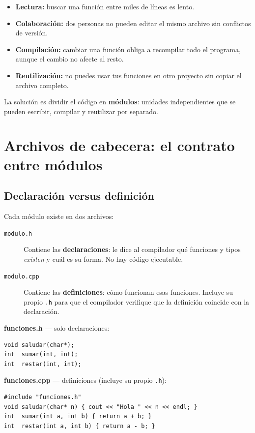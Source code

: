 \documentclass[12pt, oneside]{article}
\begin{document}
\begin{itemize}
  \item \textbf{Lectura:} buscar una función entre miles de líneas es lento.
  \item \textbf{Colaboración:} dos personas no pueden editar el mismo archivo
        sin conflictos de versión.
  \item \textbf{Compilación:} cambiar una función obliga a recompilar todo el
        programa, aunque el cambio no afecte al resto.
  \item \textbf{Reutilización:} no puedes usar tus funciones en otro proyecto
        sin copiar el archivo completo.
\end{itemize}

La solución es dividir el código en \textbf{módulos}: unidades independientes
que se pueden escribir, compilar y reutilizar por separado.

\section{Archivos de cabecera: el contrato entre módulos}

\subsection{Declaración versus definición}

Cada módulo existe en dos archivos:

\begin{description}
  \item[\texttt{modulo.h}] Contiene las \textbf{declaraciones}: le dice al
    compilador qué funciones y tipos \textit{existen} y cuál es su forma.
    No hay código ejecutable.
  \item[\texttt{modulo.cpp}] Contiene las \textbf{definiciones}: cómo
    funcionan esas funciones.  Incluye su propio \texttt{.h} para que el
    compilador verifique que la definición coincide con la declaración.
\end{description}

\textbf{funciones.h} — solo declaraciones:
\begin{verbatim}
void saludar(char*);
int  sumar(int, int);
int  restar(int, int);
\end{verbatim}

\textbf{funciones.cpp} — definiciones (incluye su propio \texttt{.h}):
\begin{verbatim}
#include "funciones.h"
void saludar(char* n) { cout << "Hola " << n << endl; }
int  sumar(int a, int b) { return a + b; }
int  restar(int a, int b) { return a - b; }
\end{verbatim}
\end{document}
